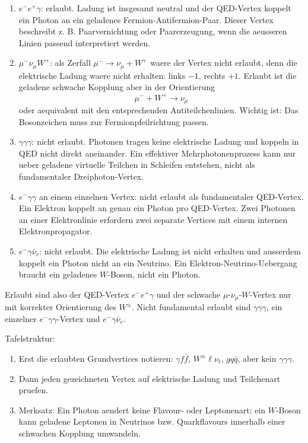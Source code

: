 \documentclass[11pt,a4paper]{scrartcl}
\begin{document}
\begin{calculationbox}[title={Pruefung der abgebildeten Vertices}]
\begin{enumerate}[label=(\arabic*)]
\item \(e^-e^+\gamma\): erlaubt. Ladung ist insgesamt neutral und der QED-Vertex koppelt ein Photon an ein geladenes Fermion-Antifermion-Paar. Dieser Vertex beschreibt z. B. Paarvernichtung oder Paarerzeugung, wenn die aeusseren Linien passend interpretiert werden.
\item \(\mu^-\nu_\mu W^+\): als Zerfall \(\mu^-\to \nu_\mu+W^+\) waere der Vertex nicht erlaubt, denn die elektrische Ladung waere nicht erhalten: links \(-1\), rechts \(+1\). Erlaubt ist die geladene schwache Kopplung aber in der Orientierung
\[
\mu^-+W^+\to \nu_\mu
\]
oder aequivalent mit den entsprechenden Antiteilchenlinien. Wichtig ist: Das Bosonzeichen muss zur Fermionpfeilrichtung passen.
\item \(\gamma\gamma\gamma\): nicht erlaubt. Photonen tragen keine elektrische Ladung und koppeln in QED nicht direkt aneinander. Ein effektiver Mehrphotonenprozess kann nur ueber geladene virtuelle Teilchen in Schleifen entstehen, nicht als fundamentaler Dreiphoton-Vertex.
\item \(e^-\gamma\gamma\) an einem einzelnen Vertex: nicht erlaubt als fundamentaler QED-Vertex. Ein Elektron koppelt an genau ein Photon pro QED-Vertex. Zwei Photonen an einer Elektronlinie erfordern zwei separate Vertices mit einem internen Elektronpropagator.
\item \(e^-\gamma\bar\nu_e\): nicht erlaubt. Die elektrische Ladung ist nicht erhalten und ausserdem koppelt ein Photon nicht an ein Neutrino. Ein Elektron-Neutrino-Uebergang braucht ein geladenes \(W\)-Boson, nicht ein Photon.
\end{enumerate}
\end{calculationbox}
\begin{answerbox}
Erlaubt sind also der QED-Vertex \(e^-e^+\gamma\) und der schwache \(\mu\)-\(\nu_\mu\)-\(W\)-Vertex nur mit korrekter Orientierung des \(W^\pm\). Nicht fundamental erlaubt sind \(\gamma\gamma\gamma\), ein einzelner \(e^-\gamma\gamma\)-Vertex und \(e^-\gamma\bar\nu_e\).
\end{answerbox}

\begin{talkbox}[title={Tafelvortrag zu Aufgabe 1}]
Tafelstruktur:
\begin{enumerate}
\item Erst die erlaubten Grundvertices notieren: \(\gamma f\bar f\), \(W^\pm \ell\nu_\ell\), \(gq\bar q\), aber kein \(\gamma\gamma\gamma\).
\item Dann jeden gezeichneten Vertex auf elektrische Ladung und Teilchenart pruefen.
\item Merksatz: Ein Photon aendert keine Flavour- oder Leptonenart; ein \(W\)-Boson kann geladene Leptonen in Neutrinos bzw. Quarkflavours innerhalb einer schwachen Kopplung umwandeln.
\end{enumerate}
\end{talkbox}
\end{document}

